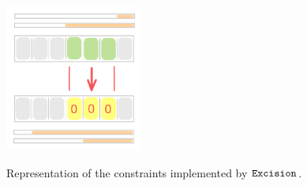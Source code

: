\begin{figure}[h!]
	\centering
	\includegraphics[width = 0.4\textwidth]{drawing/excision}
	\label{fig: one partial to one padded}
	\caption{Representation of the constraints implemented by $\texttt{Excision}$.}
\end{figure}
